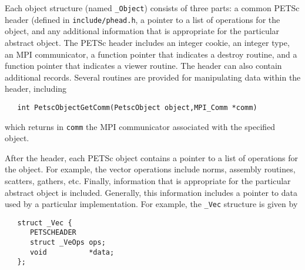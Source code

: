 Each object structure (named {\tt \_Object}) consists of three parts:
a common PETSc header (defined in {\tt include/phead.h},
a pointer to a list of operations for the
object, and any additional information that is appropriate for the
particular abstract object.  The PETSc header includes an integer
cookie, an integer type, an MPI communicator, a function pointer that
indicates a destroy routine, and a function pointer that indicates a
viewer routine. The header can also contain additional records.
Several routines are provided for manipulating data within the header,
including
\begin{verbatim}
   int PetscObjectGetComm(PetscObject object,MPI_Comm *comm) 
\end{verbatim}
which returns in {\tt comm} 
 the MPI communicator associated with the
specified object.

After the header, each PETSc object contains a pointer to a list of
operations for the object.  For example, the vector operations include
norms, assembly routines, scatters, gathers, etc.  Finally,
information that is appropriate for the particular abstract object is
included. Generally, this information includes a pointer to data used
by a particular implementation.  For example, the {\tt \_Vec}
structure is given by
\begin{verbatim}
   struct _Vec {
      PETSCHEADER
      struct _VeOps ops;
      void          *data;
   };
\end{verbatim}

